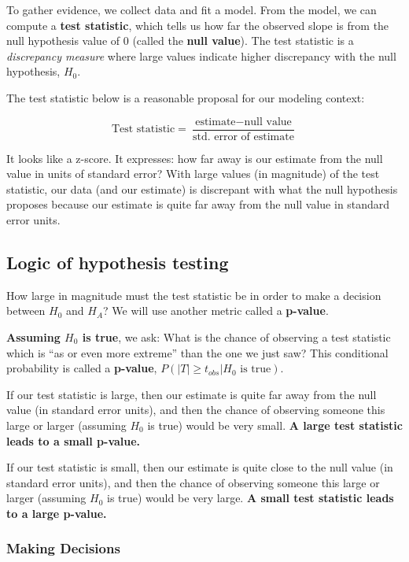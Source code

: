 \documentclass[
]{book}
\begin{document}
To gather evidence, we collect data and fit a model. From the model, we can compute a \textbf{test statistic}, which tells us how far the observed slope is from the null hypothesis value of 0 (called the \textbf{null value}). The test statistic is a \emph{discrepancy measure} where large values indicate higher discrepancy with the null hypothesis, \(H_0\).

The test statistic below is a reasonable proposal for our modeling context:

\[\text{Test statistic} = \frac{\text{estimate} - \text{null value}}{\text{std. error of estimate}}\]

It looks like a z-score. It expresses: how far away is our estimate from the null value in units of standard error? With large values (in magnitude) of the test statistic, our data (and our estimate) is discrepant with what the null hypothesis proposes because our estimate is quite far away from the null value in standard error units.

\hypertarget{logic-of-hypothesis-testing}{%
\subsection{Logic of hypothesis testing}\label{logic-of-hypothesis-testing}}

How large in magnitude must the test statistic be in order to make a decision between \(H_0\) and \(H_A\)? We will use another metric called a \textbf{p-value}.

\textbf{Assuming \(H_0\) is true}, we ask: What is the chance of observing a test statistic which is ``as or even more extreme'' than the one we just saw? This conditional probability is called a \textbf{p-value}, \(P(|T| \geq t_{obs} | H_0\text{ is true})\).

If our test statistic is large, then our estimate is quite far away from the null value (in standard error units), and then the chance of observing someone this large or larger (assuming \(H_0\) is true) would be very small. \textbf{A large test statistic leads to a small p-value.}

If our test statistic is small, then our estimate is quite close to the null value (in standard error units), and then the chance of observing someone this large or larger (assuming \(H_0\) is true) would be very large. \textbf{A small test statistic leads to a large p-value.}

\hypertarget{making-decisions}{%
\subsubsection{Making Decisions}\label{making-decisions}}
\end{document}
